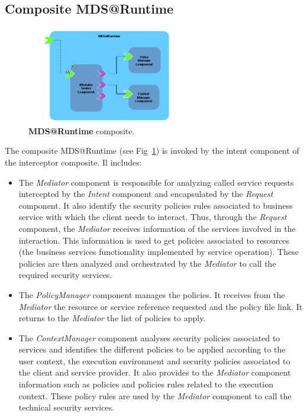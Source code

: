 \documentclass[runningheads,a4paper]{llncs}
\begin{document}
\subsection{Composite MDS@Runtime}
\begin{figure}[ht]  
\centering
\includegraphics[height=120pt, width=200pt]{mdsAtRuntimeComponent1.png}
\caption{\textbf{MDS@Runtime} composite.}
\label{fig:mdsAtRuntime}
\end{figure}

The composite MDS@Runtime  (see Fig~\ref{fig:mdsAtRuntime}) is invoked by the intent component of the interceptor composite. Il includes:


\begin{itemize}
\settowidth{\leftmargin}{{\Large$\square$}}\advance\leftmargin{}
\itemsep8pt\relax
\renewcommand\labelitemi{{\lower1.5pt\hbox{\Large$\square$}}}

\item The \emph{Mediator} component is responsible for analyzing called service requests intercepted by the  \emph{Intent} component and  encapsulated by the \emph{Request} component. It also identify the security policies rules associated to business service with which the client needs to interact. Thus, through the \emph{Request} component, the \emph{Mediator} receives information of the services involved in the interaction. This information is used to get policies associated to resources (the business services functionality implemented by service operation). These policies are then analyzed and orchestrated by the \emph{Mediator} to call the required security services.
\item The \emph{PolicyManager} component manages the policies. It receives from the \emph{Mediator} the resource or service reference requested and the policy file link. It returns to the \emph{Mediator} the list of policies to apply.
\item The \emph{ContextManager} component analyses security policies associated to services and identifies the different policies to be applied according to the user context, the execution environment and security policies associated to the client and service provider. It also provides to the \emph{Mediator} component information such as policies and policies rules related to the execution context. These policy rules are used by the \emph{Mediator} component to call the technical security services.
\end{itemize}
\end{document}
